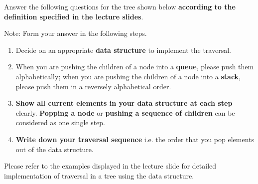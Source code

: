 
Answer the following questions for the tree shown below \textbf{according to  the definition specified in the lecture slides}.

Note: Form your answer in the following steps.
\begin{enumerate}[1.]
    \item Decide on an appropriate \textbf{data structure} to implement the traversal.
    \item When you are pushing the children of a node into a \textbf{queue}, please push them alphabetically; when you are pushing the children of a node into a \textbf{stack}, please push them in a reversely alphabetical order.
    \item \textbf{Show all current elements in your data structure at each step} clearly. \textbf{Popping a node} or \textbf{pushing a sequence of children} can be considered as one single step.
    \item \textbf{Write down your traversal sequence} i.e. the order that you pop elements out of the data structure.
\end{enumerate}

Please refer to the examples displayed in the lecture slide for detailed implementation of traversal in a tree using the data structure.

